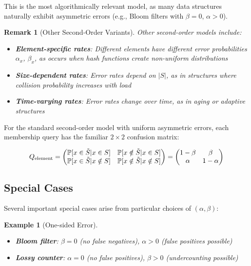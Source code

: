 \documentclass[11pt]{article}
\newtheorem{example}[theorem]{Example}
\newtheorem{remark}[theorem]{Remark}
\begin{document}
This is the most algorithmically relevant model, as many data structures naturally exhibit asymmetric errors (e.g., Bloom filters with $\beta = 0$, $\alpha > 0$).

\begin{remark}[Other Second-Order Variants]
Other second-order models include:
\begin{itemize}
\item \textbf{Element-specific rates}: Different elements have different error probabilities $\alpha_x$, $\beta_x$, as occurs when hash functions create non-uniform distributions
\item \textbf{Size-dependent rates}: Error rates depend on $|S|$, as in structures where collision probability increases with load
\item \textbf{Time-varying rates}: Error rates change over time, as in aging or adaptive structures
\end{itemize}
\end{remark}

For the standard second-order model with uniform asymmetric errors, each membership query has the familiar $2 \times 2$ confusion matrix:

\[
Q_{\text{element}} = \begin{pmatrix}
\mathbb{P}[x \in \tilde{S} | x \in S] & \mathbb{P}[x \notin \tilde{S} | x \in S] \\
\mathbb{P}[x \in \tilde{S} | x \notin S] & \mathbb{P}[x \notin \tilde{S} | x \notin S]
\end{pmatrix} = \begin{pmatrix}
1-\beta & \beta \\
\alpha & 1-\alpha
\end{pmatrix}
\]

\subsection{Special Cases}

Several important special cases arise from particular choices of $(\alpha, \beta)$:

\begin{example}[One-sided Error]
\begin{itemize}
\item \textbf{Bloom filter}: $\beta = 0$ (no false negatives), $\alpha > 0$ (false positives possible)
\item \textbf{Lossy counter}: $\alpha = 0$ (no false positives), $\beta > 0$ (undercounting possible)
\end{itemize}
\end{example}
\end{document}
